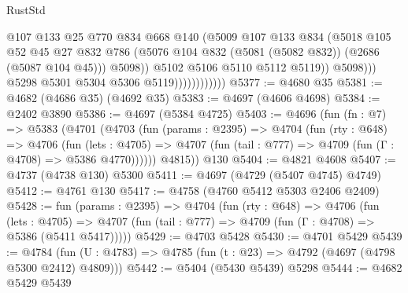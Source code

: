 \begin{lexlean}{RustStd}
\begin{coremodule}
                                      @107
                                      @133
                                      @25
                                      @770
                                      @834
                                      @668
                                      @140
                                      (@5009
                                        @107
                                        @133
                                        @834
                                        (@5018
                                          @105
                                          @52
                                          @45
                                          @27
                                          @832
                                          @786
                                          (@5076
                                            @104
                                            @832
                                            (@5081 (@5082 @832))
                                            (@2686 (@5087 @104 @45)))
                                          @5098))
                                      @5102
                                      @5106
                                      @5110
                                      @5112
                                      @5119))
                                  @5098)))
                            @5298
                            @5301
                            @5304
                            @5306
                            @5119))))))))))))
@5377 := @4680 @35
@5381 := @4682 (@4686 @35) (@4692 @35)
@5383 := @4697 (@4606 @4698)
@5384 := @2402 @3890
@5386 := @4697 (@5384 @4725)
@5403 := @4696
    (fun (fn : @7) =>
    @5383
      (@4701
        (@4703
          (fun (params : @2395) =>
          @4704
            (fun (rty : @648) =>
            @4706
              (fun (lets : @4705) =>
              @4707 (fun (tail : @777) => @4709 (fun (Γ : @4708) => @5386 @4770))))))
        @4815))
    @130
@5404 := @4821 @4608
@5407 := @4737 (@4738 @130) @5300
@5411 := @4697 (@4729 (@5407 @4745) @4749)
@5412 := @4761 @130
@5417 := @4758 (@4760 @5412 @5303 @2406 @2409)
@5428 := fun (params : @2395) =>
  @4704
    (fun (rty : @648) =>
    @4706
      (fun (lets : @4705) =>
      @4707 (fun (tail : @777) => @4709 (fun (Γ : @4708) => @5386 (@5411 @5417)))))
@5429 := @4703 @5428
@5430 := @4701 @5429
@5439 := @4784 (fun (U : @4783) => @4785 (fun (t : @23) => @4792 (@4697 (@4798 @5300 @2412) @4809)))
@5442 := @5404 (@5430 @5439) @5298
@5444 := @4682 @5429 @5439

\end{coremodule}
\end{lexlean}
